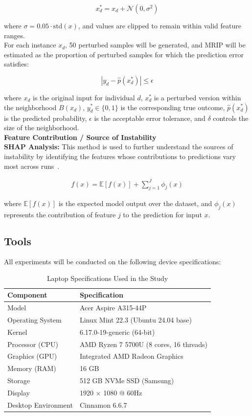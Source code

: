 \documentclass[12pt]{article}
\begin{document}
\[
x_d^* = x_d + \mathcal{N}(0, \sigma^2)
\]

where $\sigma = 0.05 \cdot \text{std}(x)$, and values are clipped to remain within valid feature ranges.\\

For each instance $x_d$, 50 perturbed samples will be generated, and MRIP will be estimated as the proportion of perturbed samples for which the prediction error satisfies:

\[
|y_d - \hat{p}(x_d^*)| \le \epsilon
\]

where \( x_d \) is the original input for individual \( d \), \( x_d^* \) is a perturbed version within the neighborhood \( B(x_d) \), \( y_d^* \in \{0,1\} \) is the corresponding true outcome, \( \hat{p}(x_d^*) \) is the predicted probability, \( \epsilon \) is the acceptable error tolerance, and \( \delta \) controls the size of the neighborhood.\\

\textbf{Feature Contribution / Source of Instability} \\
\tab \textbf{SHAP Analysis:} This method is used to further understand the sources of instability by identifying the features whose contributions to predictions vary most across runs~\cite{ponce2024practical}.

\begin{align}
  f(x) = \mathbb{E}[f(x)] + \sum_{j=1}^{J} \phi_j(x)
\end{align}

where \( \mathbb{E}[f(x)] \) is the expected model output over the dataset, and \( \phi_j(x) \) represents the contribution of feature \( j \) to the prediction for input \( x \).

\subsection{Tools} 
All experiments will be conducted on the following device specifications:

\begin{table}[h]
\centering
\caption{Laptop Specifications Used in the Study}
\begin{tabular}{|l|l|}
\hline
\textbf{Component} & \textbf{Specification} \\ \hline
Model & Acer Aspire A315-44P \\ \hline
Operating System & Linux Mint 22.3 (Ubuntu 24.04 base) \\ \hline
Kernel & 6.17.0-19-generic (64-bit) \\ \hline
Processor (CPU) & AMD Ryzen 7 5700U (8 cores, 16 threads) \\ \hline
Graphics (GPU) & Integrated AMD Radeon Graphics \\ \hline
Memory (RAM) & 16 GB \\ \hline
Storage & 512 GB NVMe SSD (Samsung) \\ \hline
Display & 1920 $\times$ 1080 @ 60Hz \\ \hline
Desktop Environment & Cinnamon 6.6.7 \\ \hline
\end{tabular}
\label{tab:laptop_specs}
\end{table}
\end{document}
